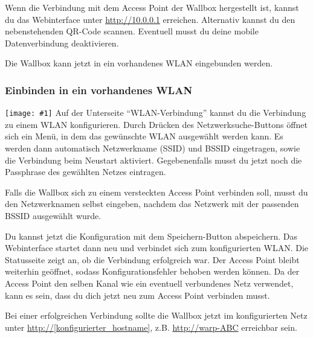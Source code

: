 \documentclass[a4paper,10pt]{article}
\newcommand{\gfx}[1]{\texttt{[image: \#1]}}
\begin{document}
\begin{multicols*}{2}
	\begin{minipage}{0.35\textwidth}
		Wenn die Verbindung mit dem Access Point der Wallbox hergestellt ist, kannst du das Webinterface
		unter \url{http://10.0.0.1} erreichen. Alternativ kannst du den nebenstehenden QR-Code scannen.
		Eventuell musst du deine mobile Datenverbindung deaktivieren.
	\end{minipage}\hfill
	\begin{minipage}{0.12\textwidth}
		\begin{flushright}
		\end{flushright}
	\end{minipage}

	Die Wallbox kann jetzt in ein vorhandenes WLAN eingebunden werden.
	\subsubsection{Einbinden in ein vorhandenes WLAN}
	\gfx{./img/resized/web_wifi_sta}
	Auf der Unterseite \enquote{WLAN-Verbindung} kannst du die Verbindung zu einem WLAN konfigurieren.
	Durch Drücken des Netzwerksuche-Buttons öffnet sich ein Menü, in dem das gewünschte WLAN ausgewählt werden kann.
	Es werden dann automatisch Netzwerkname (SSID) und BSSID eingetragen, sowie die Verbindung beim Neustart aktiviert.
	Gegebenenfalls musst du jetzt noch die Passphrase des gewählten Netzes eintragen.

	Falls die Wallbox sich zu einem versteckten Access Point verbinden soll, musst du den Netzwerknamen selbst eingeben,
	nachdem das Netzwerk mit der passenden BSSID ausgewählt wurde.

	Du kannst jetzt die Konfiguration mit dem Speichern-Button abspeichern.
	Das Webinterface startet dann neu und verbindet sich zum konfigurierten WLAN. Die Statusseite zeigt
	an, ob die Verbindung erfolgreich war. Der Access Point bleibt weiterhin
	geöffnet, sodass Konfigurationsfehler behoben werden können.
	Da der Access Point den selben Kanal wie ein eventuell verbundenes Netz verwendet,
	kann es sein, dass du dich jetzt neu zum Access Point verbinden musst.

	Bei einer erfolgreichen Verbindung sollte die Wallbox jetzt im konfigurierten Netz unter
	\url{http://[konfigurierter_hostname]}, z.B. \url{http://warp-ABC} erreichbar sein.


\end{multicols*}
\end{document}
